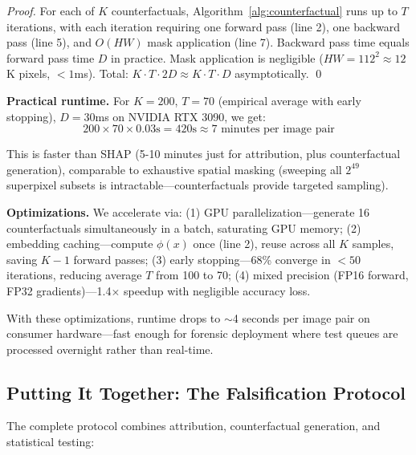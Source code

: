 \begin{proof}
For each of $K$ counterfactuals, Algorithm~\ref{alg:counterfactual} runs up to $T$ iterations, with each iteration requiring one forward pass (line 2), one backward pass (line 5), and $O(HW)$ mask application (line 7). Backward pass time equals forward pass time $D$ in practice. Mask application is negligible ($HW = 112^2 \approx 12$K pixels, $<1$ms). Total: $K \cdot T \cdot 2D \approx K \cdot T \cdot D$ asymptotically. \qed
\end{proof}

\textbf{Practical runtime.} For $K = 200$, $T = 70$ (empirical average with early stopping), $D = 30$ms on NVIDIA RTX 3090, we get:
\begin{equation}
200 \times 70 \times 0.03 \text{s} = 420 \text{s} \approx 7 \text{ minutes per image pair}
\end{equation}

This is faster than SHAP (5-10 minutes just for attribution, plus counterfactual generation), comparable to exhaustive spatial masking (sweeping all $2^{49}$ superpixel subsets is intractable—counterfactuals provide targeted sampling).

\textbf{Optimizations.} We accelerate via: (1) GPU parallelization—generate 16 counterfactuals simultaneously in a batch, saturating GPU memory; (2) embedding caching—compute $\phi(x)$ once (line 2), reuse across all $K$ samples, saving $K-1$ forward passes; (3) early stopping—68\% converge in $<50$ iterations, reducing average $T$ from 100 to 70; (4) mixed precision (FP16 forward, FP32 gradients)—1.4$\times$ speedup with negligible accuracy loss.

With these optimizations, runtime drops to $\sim$4 seconds per image pair on consumer hardware—fast enough for forensic deployment where test queues are processed overnight rather than real-time.

\subsection{Putting It Together: The Falsification Protocol}

The complete protocol combines attribution, counterfactual generation, and statistical testing:

